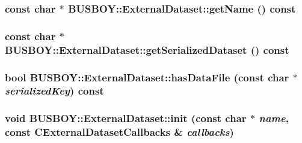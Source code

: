 \label{classBUSBOY_1_1ExternalDataset_adb7bdaf990a57db360a1144caf44ee59}
\hypertarget{classBUSBOY_1_1ExternalDataset_a8125089aa997ab26a115820951e17363}{
\subsubsection[{getName}]{\setlength{\rightskip}{0pt plus 5cm}const char $\ast$ BUSBOY::ExternalDataset::getName () const}}
\label{classBUSBOY_1_1ExternalDataset_a8125089aa997ab26a115820951e17363}
\hypertarget{classBUSBOY_1_1ExternalDataset_ad757fc5cf9424644dbcea27060f87492}{
\subsubsection[{getSerializedDataset}]{\setlength{\rightskip}{0pt plus 5cm}const char $\ast$ BUSBOY::ExternalDataset::getSerializedDataset () const}}
\label{classBUSBOY_1_1ExternalDataset_ad757fc5cf9424644dbcea27060f87492}
\hypertarget{classBUSBOY_1_1ExternalDataset_a3503bb02f3364cbf244b5c7a8e777a52}{
\subsubsection[{hasDataFile}]{\setlength{\rightskip}{0pt plus 5cm}bool BUSBOY::ExternalDataset::hasDataFile (const char $\ast$ {\em serializedKey}) const}}
\label{classBUSBOY_1_1ExternalDataset_a3503bb02f3364cbf244b5c7a8e777a52}
\hypertarget{classBUSBOY_1_1ExternalDataset_a6eaec0cd10e6357d48af66e3a0d770e7}{
\subsubsection[{init}]{\setlength{\rightskip}{0pt plus 5cm}void BUSBOY::ExternalDataset::init (const char $\ast$ {\em name}, \/  const {\bf CExternalDatasetCallbacks} \& {\em callbacks})}}
\label{classBUSBOY_1_1ExternalDataset_a6eaec0cd10e6357d48af66e3a0d770e7}
